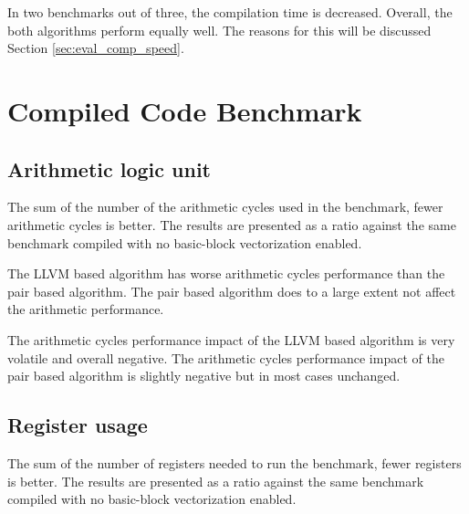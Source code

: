 \documentclass[12pt,a4paper,onecolumn,twoside,openright]{report}
\begin{document}
\begin{center}
\end{center}

In two benchmarks out of three, the compilation time is decreased. Overall, the both algorithms perform equally well. The reasons for this will be discussed Section \ref{sec:eval_comp_speed}.

\section{Compiled Code Benchmark}


\subsection{Arithmetic logic unit}
The sum of the number of the arithmetic cycles used in the benchmark, fewer arithmetic cycles is better. The results are presented as a ratio against the same benchmark compiled with no basic-block vectorization enabled.

\begin{center}
\end{center}

The LLVM based algorithm has worse arithmetic cycles performance than the pair based algorithm. The pair based algorithm does to a large extent not affect the arithmetic performance.

\begin{center}
\end{center}

The arithmetic cycles performance impact of the LLVM based algorithm is very volatile and overall negative.
The arithmetic cycles performance impact of the pair based algorithm is slightly negative but in most cases unchanged.


\subsection{Register usage}
The sum of the number of registers needed to run the benchmark, fewer registers is better. The results are presented as a ratio against the same benchmark compiled with no basic-block vectorization enabled.

\begin{center}
\end{center}
\end{document}
